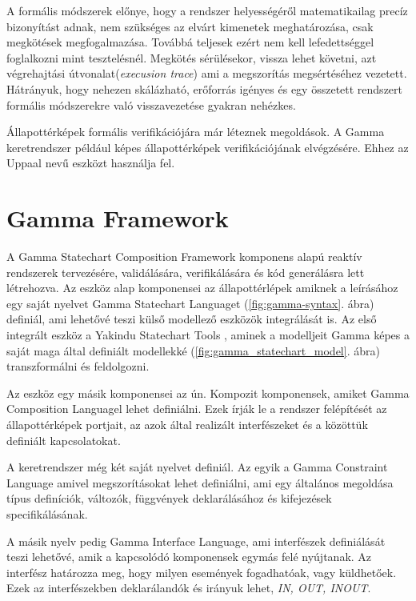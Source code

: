 A formális módszerek előnye, hogy a rendszer helyességéről matematikailag precíz bizonyítást adnak, nem szükséges az elvárt kimenetek meghatározása, csak megkötések megfogalmazása. Továbbá teljesek ezért nem kell lefedettséggel foglalkozni mint tesztelésnél. Megkötés sérülésekor, vissza lehet követni, azt végrehajtási útvonalat(\emph{execusion trace}) ami a megszorítás megsértéséhez vezetett. Hátrányuk, hogy nehezen skálázható, erőforrás igényes és egy összetett rendszert formális módszerekre való visszavezetése gyakran nehézkes.

Állapottérképek formális verifikációjára már léteznek megoldások. A Gamma keretrendszer például képes állapottérképek verifikációjának elvégzésére. Ehhez az Uppaal \cite{bengtsson1995uppaal, bengtsson1998new} nevű eszközt használja fel.

\section{Gamma Framework}
\label{sec:gamma-framework}
A Gamma Statechart Composition Framework komponens alapú reaktív rendszerek tervezésére, validálására, verifikálására és kód generálásra lett létrehozva. Az eszköz alap komponensei az állapottérlépek amiknek a leírásához egy saját nyelvet Gamma Statechart Languaget (\ref{fig:gamma-syntax}. ábra) definiál, ami lehetővé teszi külső modellező eszközök integrálását is. Az első integrált eszköz a Yakindu Statechart Tools \cite{toolsyakindu}, aminek a modelljeit Gamma képes a saját maga által definiált modellekké (\ref{fig:gamma_statechart_model}. ábra) transzformálni és feldolgozni.

Az eszköz egy másik komponensei az ún. Kompozit komponensek, amiket Gamma Composition Languagel lehet definiálni. Ezek írják le a rendszer felépítését az állapottérképek portjait, az azok által realizált interfészeket és a közöttük definiált kapcsolatokat.

A keretrendszer még két saját nyelvet definiál. Az egyik a Gamma Constraint Language amivel megszorításokat lehet definiálni, ami egy általános megoldása típus definíciók, változók, függvények deklarálásához és kifejezések specifikálásának.

A másik nyelv pedig Gamma Interface Language, ami interfészek definiálását teszi lehetővé, amik a kapcsolódó komponensek egymás felé nyújtanak. Az interfész határozza meg, hogy milyen események fogadhatóak, vagy küldhetőek. Ezek az interfészekben deklarálandók és irányuk lehet, \emph{IN, OUT, INOUT}.

